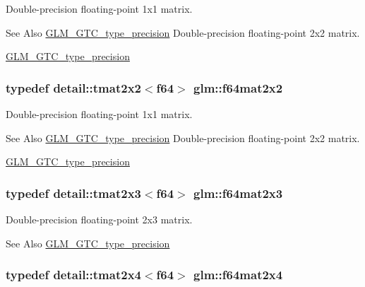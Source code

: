 Double-\/precision floating-\/point 1x1 matrix. 

\begin{DoxySeeAlso}{See Also}
\hyperlink{group__gtc__type__precision}{G\-L\-M\-\_\-\-G\-T\-C\-\_\-type\-\_\-precision} Double-\/precision floating-\/point 2x2 matrix. 

\hyperlink{group__gtc__type__precision}{G\-L\-M\-\_\-\-G\-T\-C\-\_\-type\-\_\-precision} 
\end{DoxySeeAlso}
\hypertarget{group__gtc__type__precision_ga5d1ccf7df0dedda7f0c0dd791abf3fd0}{
\subsubsection[{f64mat2x2}]{\setlength{\rightskip}{0pt plus 5cm}typedef detail\-::tmat2x2$<$f64$>$ {\bf glm\-::f64mat2x2}}}\label{group__gtc__type__precision_ga5d1ccf7df0dedda7f0c0dd791abf3fd0}


Double-\/precision floating-\/point 1x1 matrix. 

\begin{DoxySeeAlso}{See Also}
\hyperlink{group__gtc__type__precision}{G\-L\-M\-\_\-\-G\-T\-C\-\_\-type\-\_\-precision} Double-\/precision floating-\/point 2x2 matrix. 

\hyperlink{group__gtc__type__precision}{G\-L\-M\-\_\-\-G\-T\-C\-\_\-type\-\_\-precision} 
\end{DoxySeeAlso}
\hypertarget{group__gtc__type__precision_gac2bd82a88b290054fc10cfdba4a62863}{
\subsubsection[{f64mat2x3}]{\setlength{\rightskip}{0pt plus 5cm}typedef detail\-::tmat2x3$<$f64$>$ {\bf glm\-::f64mat2x3}}}\label{group__gtc__type__precision_gac2bd82a88b290054fc10cfdba4a62863}


Double-\/precision floating-\/point 2x3 matrix. 

\begin{DoxySeeAlso}{See Also}
\hyperlink{group__gtc__type__precision}{G\-L\-M\-\_\-\-G\-T\-C\-\_\-type\-\_\-precision} 
\end{DoxySeeAlso}
\hypertarget{group__gtc__type__precision_ga33d98da07dc45f5bdd5f1cbb93ad4934}{
\subsubsection[{f64mat2x4}]{\setlength{\rightskip}{0pt plus 5cm}typedef detail\-::tmat2x4$<$f64$>$ {\bf glm\-::f64mat2x4}}}\label{group__gtc__type__precision_ga33d98da07dc45f5bdd5f1cbb93ad4934}


